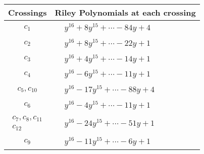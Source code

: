 \documentclass[1p]{elsarticle_modified}
\theoremstyle{definition}
\begin{document}
\begin{tabular}{m{50pt}|m{274pt}}
Crossings & \hspace{64pt}Riley Polynomials at each crossing \\
\hline $$\begin{aligned}c_{1}\end{aligned}$$&$\begin{aligned}
&y^{16}+8 y^{15}+\cdots-84 y+4
\end{aligned}$\\
\hline $$\begin{aligned}c_{2}\end{aligned}$$&$\begin{aligned}
&y^{16}+8 y^{15}+\cdots-22 y+1
\end{aligned}$\\
\hline $$\begin{aligned}c_{3}\end{aligned}$$&$\begin{aligned}
&y^{16}+4 y^{15}+\cdots-14 y+1
\end{aligned}$\\
\hline $$\begin{aligned}c_{4}\end{aligned}$$&$\begin{aligned}
&y^{16}-6 y^{15}+\cdots-11 y+1
\end{aligned}$\\
\hline $$\begin{aligned}c_{5},c_{10}\end{aligned}$$&$\begin{aligned}
&y^{16}-17 y^{15}+\cdots-88 y+4
\end{aligned}$\\
\hline $$\begin{aligned}c_{6}\end{aligned}$$&$\begin{aligned}
&y^{16}-4 y^{15}+\cdots-11 y+1
\end{aligned}$\\
\hline $$\begin{aligned}c_{7},c_{8},c_{11}\\c_{12}\end{aligned}$$&$\begin{aligned}
&y^{16}-24 y^{15}+\cdots-51 y+1
\end{aligned}$\\
\hline $$\begin{aligned}c_{9}\end{aligned}$$&$\begin{aligned}
&y^{16}-11 y^{15}+\cdots-6 y+1
\end{aligned}$\\
\hline
\end{tabular}\\~\\
\end{document}
